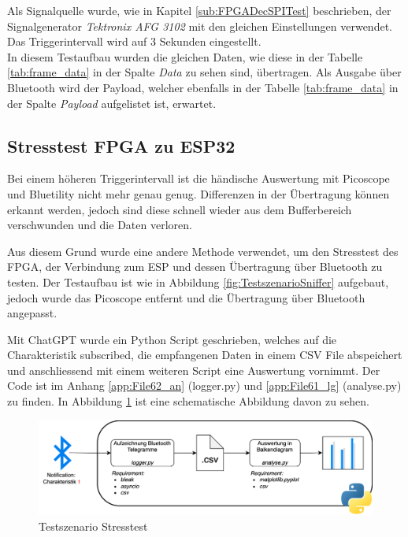 Als Signalquelle wurde, wie in Kapitel \ref{sub:FPGADecSPITest} beschrieben, der Signalgenerator \textit{Tektronix AFG 3102} mit den gleichen Einstellungen verwendet. Das Triggerintervall wird auf 3 Sekunden eingestellt.\\
In diesem Testaufbau wurden die gleichen Daten, wie diese in der Tabelle \ref{tab:frame_data} in der Spalte \textit{Data} zu sehen sind, übertragen. Als Ausgabe über Bluetooth wird der Payload, welcher ebenfalls in der Tabelle \ref{tab:frame_data} in der Spalte \textit{Payload} aufgelistet ist, erwartet.


\subsection{Stresstest FPGA zu ESP32}
\label{sub:MethStesstest}

Bei einem höheren Triggerintervall ist die händische Auswertung mit Picoscope und Bluetility nicht mehr genau genug. Differenzen in der Übertragung können erkannt werden, jedoch sind diese schnell wieder aus dem Bufferbereich verschwunden und die Daten verloren.

Aus diesem Grund wurde eine andere Methode verwendet, um den Stresstest des FPGA, der Verbindung zum ESP und dessen Übertragung über Bluetooth zu testen. Der Testaufbau ist wie in Abbildung \ref{fig:TestszenarioSniffer} aufgebaut, jedoch wurde das Picoscope entfernt und die Übertragung über Bluetooth angepasst. 

Mit ChatGPT wurde ein Python Script geschrieben, welches auf die Charakteristik subscribed, die empfangenen Daten in einem CSV File abspeichert und anschliessend mit einem weiteren Script eine Auswertung vornimmt. Der Code ist im Anhang \ref{app:File62_an} (logger.py) und \ref{app:File61_lg} (analyse.py) zu finden. In Abbildung \ref{fig:TestszStresstest} ist eine schematische Abbildung davon zu sehen. 

\begin{figure}[H]
    \centering
    \includegraphics[width=0.9\linewidth]{Figures/Chap3/Testszenarien/Testszenario_Stresstest.png}
    \caption{Testszenario Stresstest}
    \label{fig:TestszStresstest}
\end{figure}

